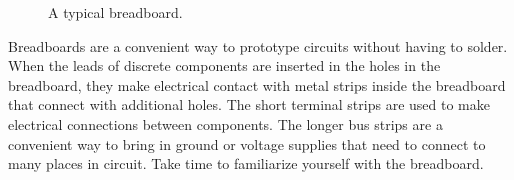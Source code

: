 \begin{figure}[htbp]
\begin{center}
\caption{A typical breadboard.}
\end{center}
\end{figure}

Breadboards are a convenient way to prototype circuits without having
to solder.  When the leads of discrete components are inserted in the
holes in the breadboard, they make electrical contact with metal
strips inside the breadboard that connect with additional holes.  
The short terminal strips are used to make electrical connections
between components.  The longer bus strips are a convenient way to
bring in ground or voltage supplies that need to connect to many
places in circuit. Take time to familiarize yourself with the breadboard. 

